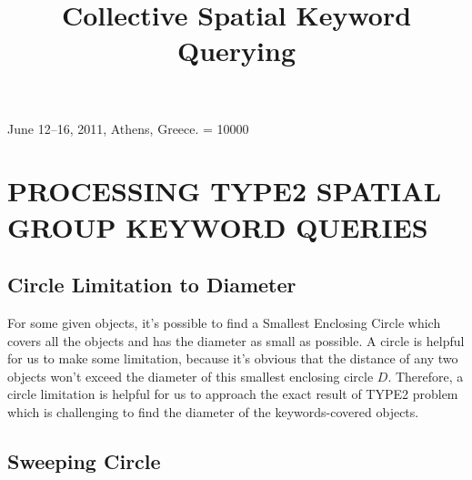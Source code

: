 \documentclass{sig-alternate}
\begin{document}
 {June 12--16, 2011, Athens, Greece.}
\widowpenalty = 10000
%

\title{Collective Spatial Keyword Querying}
%
%



\maketitle


\section{PROCESSING TYPE2 SPATIAL GROUP KEYWORD QUERIES} \label{sec:type2}
\subsection{Circle Limitation to Diameter} \label{secsub:type2:limitation}
For some given objects, it's possible to find a \textsf{Smallest Enclosing Circle}
which covers all the objects and has the diameter as small as possible. A circle is
helpful for us to make some limitation, because it's obvious that the distance of
any two objects won't exceed the diameter of this smallest enclosing circle $D$.
Therefore, a circle limitation is helpful for us to approach the exact result
of \textsf{TYPE2} problem which is challenging to find the diameter of the keywords-covered
objects.

\subsection{Sweeping Circle} \label{secsub:type2:sweeping}
\end{document}
